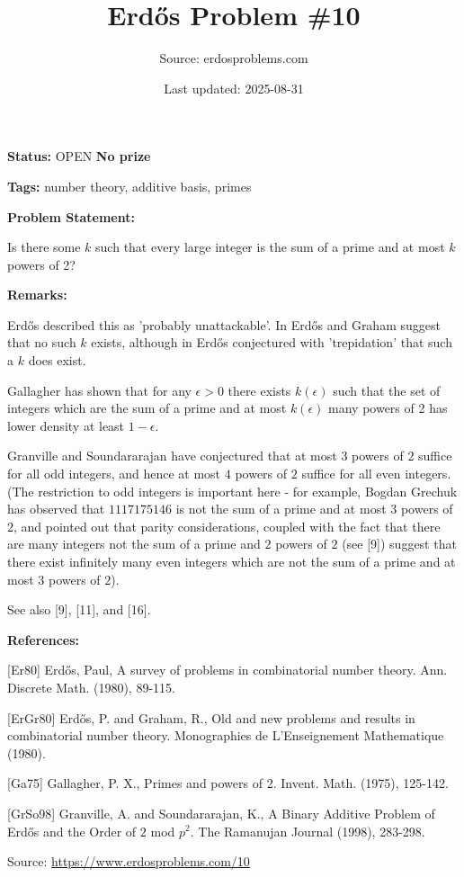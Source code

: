 \documentclass{article}
\title{Erd\H{o}s Problem \#10}
\date{Last updated: 2025-08-31}
\author{Source: erdosproblems.com}
\begin{document}
\maketitle

\noindent\textbf{Status:} OPEN \quad \textbf{No prize}

\noindent\textbf{Tags:} number theory, additive basis, primes

\medskip
\noindent\textbf{Problem Statement:}

Is there some $k$ such that every large integer is the sum of a prime and at most $k$ powers of 2?

\bigskip
\noindent\textbf{Remarks:}

Erd\H{o}s described this as 'probably unattackable'. In \cite{ErGr80} Erd\H{o}s and Graham suggest that no such $k$ exists, although in \cite{Er80} Erd\H{o}s conjectured with 'trepidation' that such a $k$ does exist.

Gallagher \cite{Ga75} has shown that for any $\epsilon>0$ there exists $k(\epsilon)$ such that the set of integers which are the sum of a prime and at most $k(\epsilon)$ many powers of 2 has lower density at least $1-\epsilon$. 

Granville and Soundararajan \cite{GrSo98} have conjectured that at most $3$ powers of 2 suffice for all odd integers, and hence at most $4$ powers of $2$ suffice for all even integers. (The restriction to odd integers is important here - for example, Bogdan Grechuk has observed that $1117175146$ is not the sum of a prime and at most $3$ powers of $2$, and pointed out that parity considerations, coupled with the fact that there are many integers not the sum of a prime and $2$ powers of $2$ (see [9]) suggest that there exist infinitely many even integers which are not the sum of a prime and at most $3$ powers of $2$).

See also [9], [11], and [16].

\bigskip
\noindent\textbf{References:}

[Er80] Erd\H{o}s, Paul, A survey of problems in combinatorial number theory. Ann. Discrete Math. (1980), 89-115.
 
 [ErGr80] Erd\H{o}s, P. and Graham, R., Old and new problems and results in combinatorial number theory. Monographies de L'Enseignement Mathematique (1980).
 
 [Ga75] Gallagher, P. X., Primes and powers of 2. Invent. Math. (1975), 125-142.
 
 [GrSo98] Granville, A. and Soundararajan, K., A Binary Additive Problem of Erd\H{o}s and the Order of $2$ mod $p^2$. The Ramanujan Journal (1998), 283-298.

\bigskip
\noindent\small{Source: \url{https://www.erdosproblems.com/10}}
\end{document}
